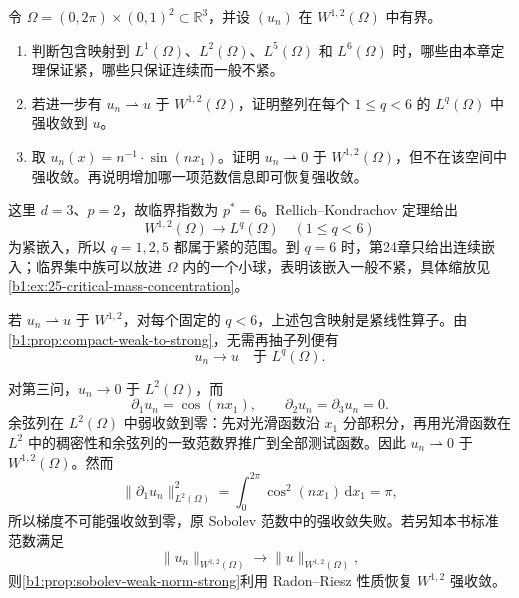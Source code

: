 \begin{exercise}\label{b1:ex:25-rellich-regimes}
令 \(\Omega=(0,2\pi)\times(0,1)^2\subset\mathbb R^3\)，并设 \((u_n)\) 在 \(W^{1,2}(\Omega)\) 中有界。
\begin{enumerate}
\item 判断包含映射到 \(L^1(\Omega)\)、\(L^2(\Omega)\)、\(L^5(\Omega)\) 和 \(L^6(\Omega)\) 时，哪些由本章定理保证紧，哪些只保证连续而一般不紧。
\item 若进一步有 \(u_n\rightharpoonup u\) 于 \(W^{1,2}(\Omega)\)，证明整列在每个 \(1\le q<6\) 的 \(L^q(\Omega)\) 中强收敛到 \(u\)。
\item 取 \(u_n(x)=n^{-1}\cdot \sin(nx_1)\)。证明 \(u_n\rightharpoonup0\) 于 \(W^{1,2}(\Omega)\)，但不在该空间中强收敛。再说明增加哪一项范数信息即可恢复强收敛。
\end{enumerate}
\end{exercise}
\begin{solution}
这里 \(d=3\)、\(p=2\)，故临界指数为 \(p^*=6\)。Rellich–Kondrachov 定理给出
\[
 W^{1,2}(\Omega)\longrightarrow L^q(\Omega)
 \quad(1\le q<6)
\]
为紧嵌入，所以 \(q=1,2,5\) 都属于紧的范围。到 \(q=6\) 时，第24章只给出连续嵌入；临界集中族可以放进 \(\Omega\) 内的一个小球，表明该嵌入一般不紧，具体缩放见\cref{b1:ex:25-critical-mass-concentration}。

若 \(u_n\rightharpoonup u\) 于 \(W^{1,2}\)，对每个固定的 \(q<6\)，上述包含映射是紧线性算子。由\cref{b1:prop:compact-weak-to-strong}，无需再抽子列便有
\[
 u_n\longrightarrow u\quad\text{于 }L^q(\Omega).
\]

对第三问，\(u_n\to0\) 于 \(L^2(\Omega)\)，而
\[
 \partial_1u_n=\cos(nx_1),\qquad
 \partial_2u_n=\partial_3u_n=0.
\]
余弦列在 \(L^2(\Omega)\) 中弱收敛到零：先对光滑函数沿 \(x_1\) 分部积分，再用光滑函数在 \(L^2\) 中的稠密性和余弦列的一致范数界推广到全部测试函数。因此 \(u_n\rightharpoonup0\) 于 \(W^{1,2}(\Omega)\)。然而
\[
 \|\partial_1u_n\|_{L^2(\Omega)}^2
 =\int_0^{2\pi}\cos^2(nx_1)\,\mathrm dx_1=\pi,
\]
所以梯度不可能强收敛到零，原 Sobolev 范数中的强收敛失败。若另知本书标准范数满足
\[
 \|u_n\|_{W^{1,2}(\Omega)}\longrightarrow
 \|u\|_{W^{1,2}(\Omega)},
\]
则\cref{b1:prop:sobolev-weak-norm-strong}利用 Radon–Riesz 性质恢复 \(W^{1,2}\) 强收敛。
\end{solution}

